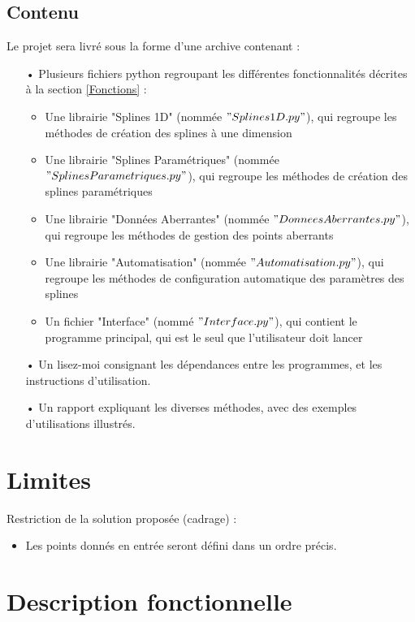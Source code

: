 \documentclass[a4paper,12pt]{article}
\begin{document}
\subsection*{Contenu}
Le projet sera livré sous la forme d'une archive contenant :
\begin{itemize}
\item[•] Plusieurs fichiers python regroupant les différentes fonctionnalités décrites à la section \ref{Fonctions}  : 
\begin{itemize}
\item Une librairie "Splines 1D" (nommée $"Splines1D.py"$), qui regroupe les méthodes de création des splines à une dimension
\item Une librairie "Splines Paramétriques" (nommée $"SplinesParametriques.py"$), qui regroupe les méthodes de création des splines paramétriques
\item Une librairie "Données Aberrantes" (nommée $"DonneesAberrantes.py"$), qui regroupe les méthodes de gestion des points aberrants
\item Une librairie "Automatisation" (nommée $"Automatisation.py"$), qui regroupe les méthodes de configuration automatique des paramètres des splines
\item Un fichier "Interface" (nommé $"Interface.py"$), qui contient le programme principal, qui est le seul que l'utilisateur doit lancer
\end{itemize}
\item[•] Un lisez-moi consignant les dépendances entre les programmes, et les instructions d'utilisation.
\item[•] Un rapport expliquant les diverses méthodes, avec des exemples d’utilisations illustrés.
\end{itemize}

\section{Limites}

Restriction de la solution proposée (cadrage) :
\begin{itemize}
\item Les points donnés en entrée seront défini dans un ordre précis.
\end{itemize}

\section{Description fonctionnelle}
\end{document}

